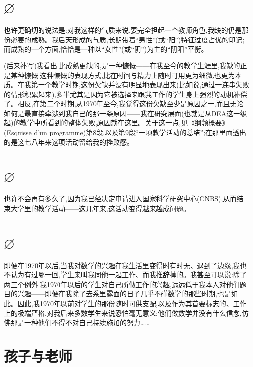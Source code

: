 \section{$\varnothing$}

也许更确切的说法是:对我这样的气质来说,要完全担起一个教师角色,我缺的仍是那份必要的成熟。我后天形成的气质,长期带着“男性”(或“阳”)特征过度占优的印记;而成熟的一个方面,恰恰是一种以“女性”(或“阴”)为主的“阴阳”平衡。

(后来补写)我看出,比成熟更缺的,是一种慷慨——在我至今的教学生涯里,我缺的正是某种慷慨;这种慷慨的表现方式,比在时间与精力上随时可用更为细微,也更为本质。在我第一个教学时期,这份欠缺并没有明显地表现出来(比如说,通过一连串失败的情形积累起来),多半尤其是因为它被选择来跟我工作的学生身上强烈的动机补偿了。相反,在第二个时期,从1970年至今,我觉得这份欠缺至少是原因之一,而且无论如何是最直接牵涉到我自己的那一条原因——我在研究层面(也就是从DEA这一级起)的教学中所看到的整体失败,原因就在这里。关于这一点,见《纲领概要》(Esquisse d'un programme)第8段,以及第9段“一项教学活动的总结”;在那里面透出的是这七八年来这项活动留给我的挫败感。

\section{$\varnothing$}

也许不会再有多久了,因为我已经决定申请进入国家科学研究中心(CNRS),从而结束大学里的教学活动——这几年来,这活动变得越来越成问题。

\section{$\varnothing$}

即便在1970年以后,当我对数学的兴趣在我生活里变得时有时无、退到了边缘,我也不认为有过哪一回,学生来叫我同他一起工作、而我推辞掉的。我甚至可以说:除了两三个例外,我1970年以后的学生对自己所做工作的兴趣,远远低于我本人对他们题目的兴趣——即便在我除了去系里露面的日子几乎不碰数学的那些时期,也是如此。因此,我1970年以前对学生的那份随时可供支配,以及作为其首要标志的、工作上的极端严格,对我后来多数学生来说恐怕毫无意义:他们做数学并没有什么信念,仿佛那是一种他们不得不对自己持续施加的努力……

\section{孩子与老师}

